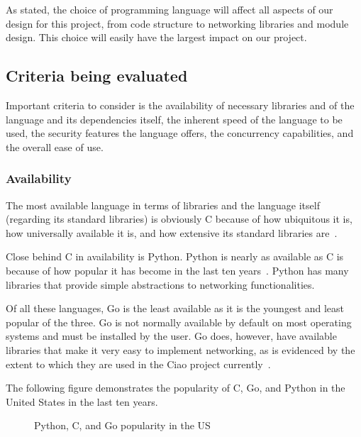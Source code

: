 \documentclass[10pt,letterpaper,onecolumn,draftclsnofoot]{IEEEtran}
\begin{document}
As stated, the choice of programming language will affect all aspects of our
design for this project, from code structure to networking libraries and module
design. This choice will easily have the largest impact on our project.

\subsection{Criteria being evaluated}

Important criteria to consider is the availability of necessary libraries and of
the language and its dependencies itself, the inherent speed of the language to
be used, the security features the language offers, the concurrency
capabilities, and the overall ease of use.

\subsubsection{Availability}

The most available language in terms of libraries and the language itself
(regarding its standard libraries) is obviously C because of how ubiquitous it
is, how universally available it is, and how extensive its standard libraries
are~\cite{SOC}.

Close behind C in availability is Python. Python is nearly as available as C is
because of how popular it has become in the last ten years~\cite{PYPL}. Python
has many libraries that provide simple abstractions to networking
functionalities.

Of all these languages, Go is the least available as it is the youngest and
least popular of the three. Go is not normally available by default on most
operating systems and must be installed by the user. Go does, however, have
available libraries that make it very easy to implement networking, as is
evidenced by the extent to which they are used in the Ciao project
currently~\cite{ciao}.

The following figure demonstrates the popularity of C, Go, and Python in the
United States in the last ten years.

\begin{figure}[H]
	\begin{center}
		\caption{Python, C, and Go popularity in the US~\cite{PYPL}}
	\end{center}
\end{figure}
\end{document}
